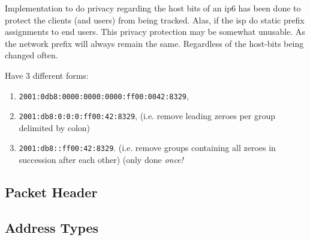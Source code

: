 Implementation to do privacy regarding the host bits of an \gls{ip6} has been done to protect the clients (and users) from being tracked. Alas, if the \gls{isp} do static prefix assignments to end users. This privacy protection may be somewhat unusable. As the network prefix will always remain the same. Regardless of the host-bits being changed often.

Have 3 different forms:
\begin{enumerate}
    \item \texttt{2001:0db8:0000:0000:0000:ff00:0042:8329},
    \item \texttt{2001:db8:0:0:0:ff00:42:8329}, {\footnotesize (i.e. remove leading zeroes per group delimited by colon)}
    \item \texttt{2001:db8::ff00:42:8329}. {\footnotesize (i.e. remove groups containing all zeroes in succession after each other) (only done \textit{once!}}
\end{enumerate}

\subsection{Packet Header}


\subsection{Address Types}

